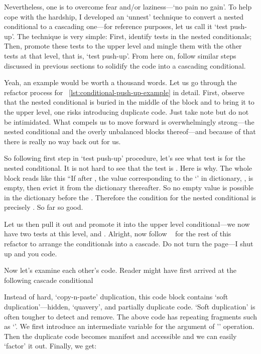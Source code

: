 Nevertheless, one is to overcome fear and/or laziness---`no pain no gain'.
To help cope with the hardship, I developed an `unnest' technique to convert a nested conditional
to a cascading one---for reference purposes, let us call it `test push-up'.
The technique is very simple:
First, identify tests in the nested conditionals;
Then, promote these tests to the upper level and mingle them with the other tests at that level,
that is, `test push-up'.
From here on, follow similar steps discussed in previous sections to solidify the code into a
cascading conditional.


Yeah, an example would be worth a thousand words.
Let us go through the refactor process for ~\autoref{lst:conditional-push-up-example} in detail.
First, observe that the nested  conditional is
buried in the middle of the  block and to bring it to the upper level, one risks
introducing duplicate code.
Just take note but do not be intimidated.
What compels us to move forward is overwhelmingly
strong---the nested conditional and the overly unbalanced  blocks thereof---and
because of that there is really no way back out for us.


So following first step in `test push-up' procedure, let's see what test is for the nested conditional.
It is not hard to see that the test is .
Here is why.
The whole block reads like this ``If after , the value corresponding to the
`' in dictionary, , is empty, then evict it from the dictionary thereafter.
So no empty value is possible in the dictionary before the .
Therefore the condition for the nested conditional is precisely .
So far so good.

Let us then pull it out and promote it into the upper level conditional---we now have two tests
at this level,  and .
Alright, now follow ~
for the rest of this refactor to arrange the conditionals into a cascade.
Do not turn the page---I shut up and you code.


\clearpage
Now let's examine each other's code.
Reader might have first arrived at the following cascade conditional


Instead of hard, `copy-n-paste' duplication, this code block contains `soft
duplication'---hidden, `quavery', and partially duplicate code.
`Soft duplication' is often tougher to detect and remove.
The above code has repeating fragments such as `'.
We first introduce an intermediate variable for the argument of '' operation.
Then the duplicate code becomes manifest and accessible and we can easily `factor' it out.
Finally, we get:



